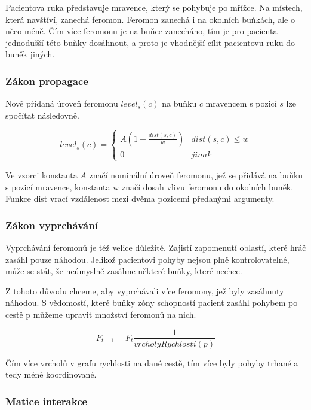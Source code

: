Pacientova ruka představuje mravence, který se pohybuje po mřížce. Na místech, která navštíví, zanechá feromon. Feromon zanechá i na okolních buňkách, ale o něco méně. Čím více feromonu je na buňce zanecháno, tím je pro pacienta jednodušší této buňky dosáhnout, a proto je vhodnější cílit pacientovu ruku do buněk jiných.

\subsubsection{Zákon propagace}

Nově přidaná úroveň feromonu $level_s(c)$ na buňku $c$ mravencem s pozicí $s$ lze spočítat následovně.


\begin{equation}
	level_s(c)= \begin{cases}
											  A(1-\frac{dist(s, c)}{w}) & dist(s, c) \leq w \\
												0 & jinak
										 \end{cases}
\end{equation}

Ve vzorci konstanta $A$ značí nominální úroveň feromonu, jež se přidává na buňku s pozicí mravence, konstanta w značí dosah vlivu feromonu do okolních buněk. Funkce dist vrací vzdálenost mezi dvěma pozicemi předanými argumenty.

\subsubsection{Zákon vyprchávání}

Vyprchávání feromonů je též velice důležité. Zajistí zapomenutí oblastí, které hráč zasáhl pouze náhodou. Jelikož pacientovi pohyby nejsou plně kontrolovatelné, může se stát, že neúmyslně zasáhne některé buňky, které nechce.

Z tohoto důvodu chceme, aby vyprchávali více feromony, jež byly zasáhnuty náhodou. S vědomostí, které buňky zóny schopností pacient zasáhl pohybem po cestě p můžeme upravit množství feromonů na nich.

\begin{equation}
	F_{t+1} = F_t\frac{1}{vrcholyRychlosti(p)}
\end{equation}

Čím více vrcholů v grafu rychlosti na dané cestě, tím více byly pohyby trhané a tedy méně koordinované.

\subsubsection{Matice interakce}

